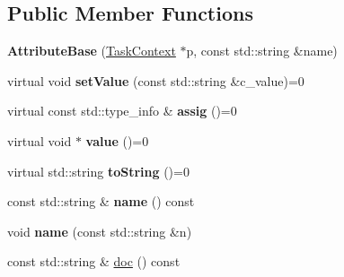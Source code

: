 \subsection*{Public Member Functions}
\begin{DoxyCompactItemize}
\item 
\hypertarget{classcoco_1_1_attribute_base_a91ba95249f0d57b4eb18fbc65649d74f}{}{\bfseries Attribute\+Base} (\hyperlink{classcoco_1_1_task_context}{Task\+Context} $\ast$p, const std\+::string \&name)\label{classcoco_1_1_attribute_base_a91ba95249f0d57b4eb18fbc65649d74f}

\item 
\hypertarget{classcoco_1_1_attribute_base_a18fdc12e5d8c59672d94d4dbc85a1508}{}virtual void {\bfseries set\+Value} (const std\+::string \&c\+\_\+value)=0\label{classcoco_1_1_attribute_base_a18fdc12e5d8c59672d94d4dbc85a1508}

\item 
\hypertarget{classcoco_1_1_attribute_base_aa13d350700c8e427588996cc1d6e13f7}{}virtual const std\+::type\+\_\+info \& {\bfseries assig} ()=0\label{classcoco_1_1_attribute_base_aa13d350700c8e427588996cc1d6e13f7}

\item 
\hypertarget{classcoco_1_1_attribute_base_a3a036a12d37b626b32029720d3319989}{}virtual void $\ast$ {\bfseries value} ()=0\label{classcoco_1_1_attribute_base_a3a036a12d37b626b32029720d3319989}

\item 
\hypertarget{classcoco_1_1_attribute_base_aebdb7487eae12da4423f2c89f6b96ba6}{}virtual std\+::string {\bfseries to\+String} ()=0\label{classcoco_1_1_attribute_base_aebdb7487eae12da4423f2c89f6b96ba6}

\item 
\hypertarget{classcoco_1_1_attribute_base_a145d59a25865b63c1911677fb672ecfc}{}const std\+::string \& {\bfseries name} () const \label{classcoco_1_1_attribute_base_a145d59a25865b63c1911677fb672ecfc}

\item 
\hypertarget{classcoco_1_1_attribute_base_a218ce4d45c5c3a061e141f9b33f4412d}{}void {\bfseries name} (const std\+::string \&n)\label{classcoco_1_1_attribute_base_a218ce4d45c5c3a061e141f9b33f4412d}

\item 
\hypertarget{classcoco_1_1_attribute_base_ac593f2318da763db052ee1436f862cde}{}const std\+::string \& \hyperlink{classcoco_1_1_attribute_base_ac593f2318da763db052ee1436f862cde}{doc} () const \label{classcoco_1_1_attribute_base_ac593f2318da763db052ee1436f862cde}


\end{DoxyCompactItemize}
